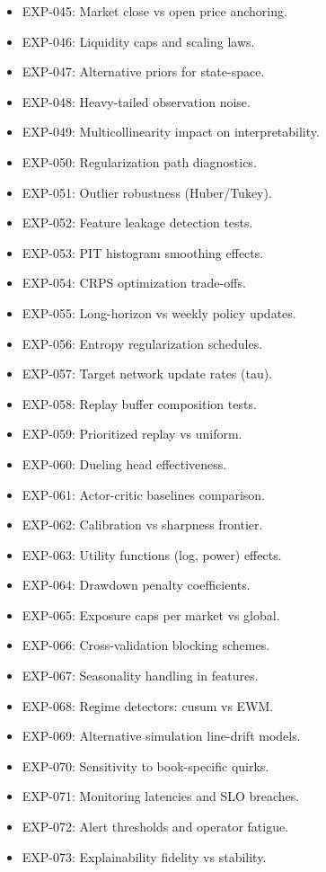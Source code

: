 \documentclass[12pt]{report}  %
\numberwithin{equation}{section}
\theoremstyle{plain}
\theoremstyle{definition}
\theoremstyle{remark}
\begin{document}
\begin{itemize}
  \item EXP-045: Market close vs open price anchoring.
  \item EXP-046: Liquidity caps and scaling laws.
  \item EXP-047: Alternative priors for state-space.
  \item EXP-048: Heavy-tailed observation noise.
  \item EXP-049: Multicollinearity impact on interpretability.
  \item EXP-050: Regularization path diagnostics.
  \item EXP-051: Outlier robustness (Huber/Tukey).
  \item EXP-052: Feature leakage detection tests.
  \item EXP-053: PIT histogram smoothing effects.
  \item EXP-054: CRPS optimization trade-offs.
  \item EXP-055: Long-horizon vs weekly policy updates.
  \item EXP-056: Entropy regularization schedules.
  \item EXP-057: Target network update rates (tau).
  \item EXP-058: Replay buffer composition tests.
  \item EXP-059: Prioritized replay vs uniform.
  \item EXP-060: Dueling head effectiveness.
  \item EXP-061: Actor-critic baselines comparison.
  \item EXP-062: Calibration vs sharpness frontier.
  \item EXP-063: Utility functions (log, power) effects.
  \item EXP-064: Drawdown penalty coefficients.
  \item EXP-065: Exposure caps per market vs global.
  \item EXP-066: Cross-validation blocking schemes.
  \item EXP-067: Seasonality handling in features.
  \item EXP-068: Regime detectors: cusum vs EWM.
  \item EXP-069: Alternative simulation line-drift models.
  \item EXP-070: Sensitivity to book-specific quirks.
  \item EXP-071: Monitoring latencies and SLO breaches.
  \item EXP-072: Alert thresholds and operator fatigue.
  \item EXP-073: Explainability fidelity vs stability.

\end{itemize}
\end{document}
